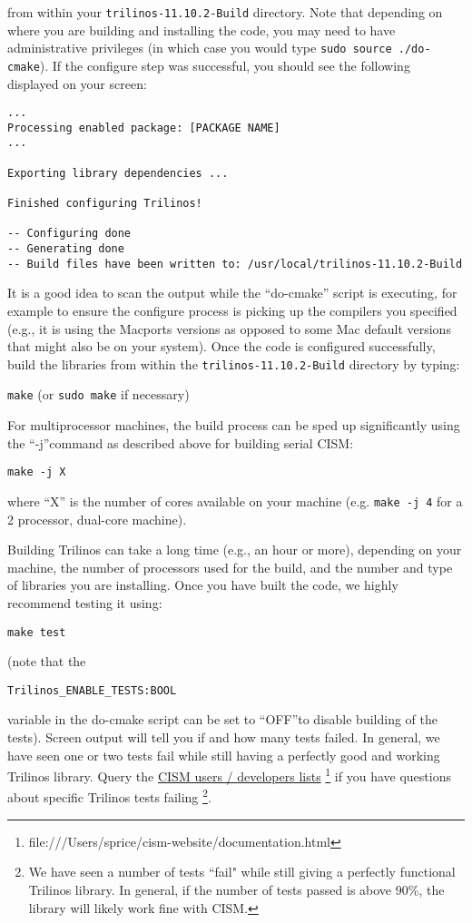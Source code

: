 from within your \texttt{trilinos-11.10.2-Build} directory. Note that depending on where you are building and installing the code, you may need to have administrative privileges (in which case you would type \texttt{sudo source ./do-cmake}). If the configure step was successful, you should see the following displayed on your screen:

\begin{verbatim}
...
Processing enabled package: [PACKAGE NAME]
...

Exporting library dependencies ...

Finished configuring Trilinos!

-- Configuring done
-- Generating done
-- Build files have been written to: /usr/local/trilinos-11.10.2-Build
\end{verbatim}

It is a good idea to scan the output while the ``do-cmake'' script is executing, 
for example to ensure the configure process is picking up the compilers you specified 
(e.g., it is using the Macports versions as opposed to some Mac default versions that 
might also be on your system). Once the code is configured successfully, build the libraries 
from within the \texttt{trilinos-11.10.2-Build} directory by typing:

\texttt{make} (or \texttt{sudo make} if necessary) 

For multiprocessor machines, the build process can be sped up significantly using 
the ``-j''command as described above for building serial CISM:

\texttt{make -j X}

where ``X'' is the number of cores available on your machine (e.g. \texttt{make -j 4} 
for a 2 processor, dual-core machine).

Building Trilinos can take a long time (e.g., an hour or more), depending on your machine, 
the number of processors used for the build, and the number and type of libraries 
you are installing. Once you have built the code, we highly recommend testing it 
using:

 \texttt{make test} 

(note that the

\begin{verbatim}
Trilinos_ENABLE_TESTS:BOOL
\end{verbatim}

variable in the do-cmake script can be set to ``OFF''to disable building of the tests). 
Screen output will tell you if and how many tests failed. In general, we have seen 
one or two tests fail while still having a perfectly good and working Trilinos library. 
Query the \href{file:///Users/sprice/cism-website/documentation.html}{CISM users / developers lists}
\footnote{file:///Users/sprice/cism-website/documentation.html} if you have questions 
about specific Trilinos tests failing \footnote{We have seen a number of tests ``fail" while still giving a perfectly 
functional Trilinos library. In general, if the number of tests passed is above 90\%, the library will likely work
fine with CISM.}.

